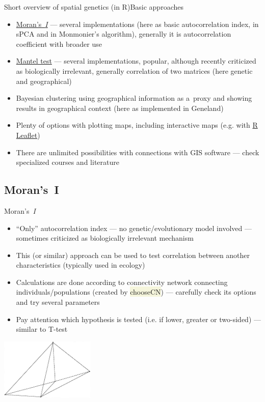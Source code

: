 \documentclass[compress, ucs, xelatex, 11pt, xcolor=svgnames, aspectratio=169,
	hyperref={
		bookmarks=true,
		unicode=true,
		colorlinks=true,
		pdftitle={Molecular data in R},
		plainpages=false,
		pdfauthor={Vojtech Zeisek},
		pdfsubject={Course about phylogeny and evolution in R},
		pdfcreator={XeLaTeX},
		pdfkeywords={R, evolution, phylogeny, molecular data},
		linkcolor=Crimson, %
		anchorcolor=Magenta, %
		citecolor=Magenta, %
		filecolor=Magenta, %
		menucolor=Magenta, %
		urlcolor=DodgerBlue, %
		pdftex},
	url={hyphens, lowtilde} %
	]{beamer}
\renewcommand{\texttt}[1]{\colorbox{Beige}{{\ttfamily #1}}}
\begin{document}
\begin{frame}{Short overview of spatial genetics (in R)}{Basic approaches}
	\begin{itemize}
		\item \href{https://en.wikipedia.org/wiki/Moran\%27s_I}{Moran's~\textit{I}} --- several implementations (here as basic autocorrelation index, in sPCA and in Monmonier's algorithm), generally it is autocorrelation coefficient with broader use
		\item \href{https://en.wikipedia.org/wiki/Mantel_test}{Mantel test} --- several implementations, popular, although recently criticized as biologically irrelevant, generally correlation of two matrices (here genetic and geographical)
		\item Bayesian clustering using geographical information as a~proxy and showing results in geographical context (here as implemented in Geneland)
		\item Plenty of options with plotting maps, including interactive maps (e.g. with \href{https://rstudio.github.io/leaflet/}{R Leaflet})
		\item There are unlimited possibilities with connections with GIS software --- check specialized courses and literature
	\end{itemize}
\end{frame}

\subsection{Moran's~I}

\begin{frame}{Moran's~\textit{I}}
	\begin{multicols}{2}
		\begin{itemize}
			\item \enquote{Only} autocorrelation index --- no genetic/evolutionary model involved --- sometimes criticized as biologically irrelevant mechanism
			\item This (or similar) approach can be used to test correlation between another characteristics (typically used in ecology)
			\item Calculations are done according to connectivity network connecting individuals/populations (created by \texttt{chooseCN}) --- carefully check its options and try several parameters
			\item Pay attention which hypothesis is tested (i.e. if lower, greater or two-sided) --- similar to T-test
		\end{itemize}
		\begin{center}
			\includegraphics[width=4.5cm]{choosecn.png}
		\end{center}
	\end{multicols}
\end{frame}
\end{document}
